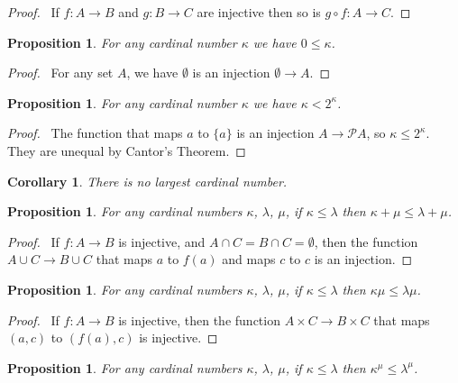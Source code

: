 \documentclass{book}
\let\qed\relax
\newtheorem{prop}[ax]{Proposition}
\newtheorem{cor}{Corollary}[ax]
\theoremstyle{definition}
\begin{document}
\begin{proof}
\pf\ If $f : A \rightarrow B$ and $g : B \rightarrow C$ are injective then so is $g \circ f : A \rightarrow C$. \qed
\end{proof}

\begin{prop}
For any cardinal number $\kappa$ we have $0 \leq \kappa$.
\end{prop}

\begin{proof}
\pf\ For any set $A$, we have $\emptyset$ is an injection $\emptyset \rightarrow A$. \qed
\end{proof}

\begin{prop}
For any cardinal number $\kappa$ we have $\kappa < 2^\kappa$.
\end{prop}

\begin{proof}
\pf\ The function that maps $a$ to $\{a\}$ is an injection $A \rightarrow \mathcal{P} A$, so $\kappa \leq 2^\kappa$. They are unequal by Cantor's Theorem. \qed
\end{proof}

\begin{cor}
There is no largest cardinal number.
\end{cor}

\begin{prop}
For any cardinal numbers $\kappa$, $\lambda$, $\mu$, if $\kappa \leq \lambda$ then $\kappa + \mu \leq \lambda + \mu$.
\end{prop}

\begin{proof}
\pf\ If $f : A \rightarrow B$ is injective, and $A \cap C = B \cap C = \emptyset$, then the function $A \cup C \rightarrow B \cup C$ that maps $a$ to $f(a)$ and maps $c$ to $c$ is an injection. \qed
\end{proof}

\begin{prop}
For any cardinal numbers $\kappa$, $\lambda$, $\mu$, if $\kappa \leq \lambda$ then $\kappa \mu \leq \lambda \mu$.
\end{prop}

\begin{proof}
\pf\ If $f : A \rightarrow B$ is injective, then the function $A \times C \rightarrow B \times C$ that maps $(a,c)$ to $(f(a),c)$ is injective. \qed
\end{proof}

\begin{prop}
For any cardinal numbers $\kappa$, $\lambda$, $\mu$, if $\kappa \leq \lambda$ then $\kappa^\mu \leq \lambda^\mu$.
\end{prop}
\end{document}
